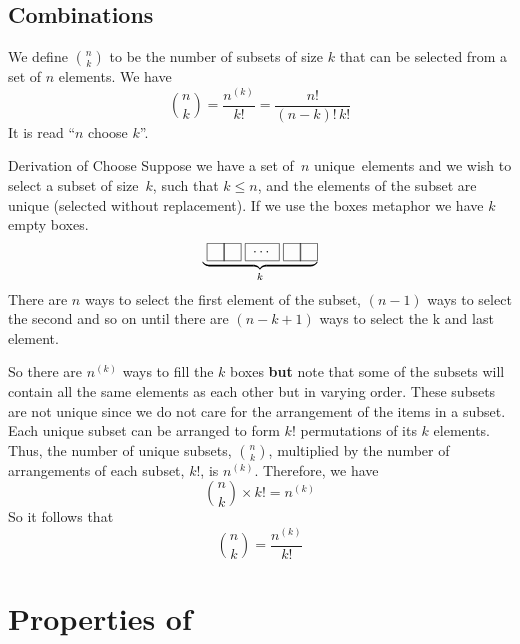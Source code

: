 \subsection*{Combinations}
We define $\binom{n}{k}$ to be the number of subsets of size $k$ that can be selected from a set of $n$ elements. We have
\[
    \binom{n}{k} = \frac{n^{(k)}}{k!} = \frac{n!}{(n-k)!\,k!}
\]
It is read ``$n$ choose $k$''.
\begin{theory}{Derivation of Choose}
Suppose we have a set of~$n$ unique~elements and we wish to select a subset of size~$k$, such that $k \leq n$, and the elements of the subset are unique (selected without replacement). If we use the boxes metaphor we have $k$ empty boxes. 
\[
    \underbrace{\pboxes{0}}_k
\]
There are $n$ ways to select the first element of the subset, $(n-1)$ ways to select the second and so on until there are $(n-k+1)$ ways to select the k and last element.
\par\medskip
So there are $n^{(k)}$ ways to fill the $k$ boxes \textbf{but} note that some of the subsets will contain all the same elements as each other but in varying order. These subsets are not unique since we do not care for the arrangement of the items in a subset. Each unique subset can be arranged to form $k!$ permutations of its $k$ elements. Thus, the number of unique subsets, $\binom{n}{k}$, multiplied by the number of arrangements of each subset, $k!$, is $n^{(k)}$. Therefore, we have
\[
    \binom{n}{k} \times k! = n^{(k)}
\]
So it follows that
\[
    \binom{n}{k} = \frac{n^{(k)}}{k!}
\]
\end{theory}
\section{Properties of }